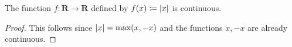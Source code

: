 \begin{proposition}\label{9.4.12}
    The function \(f : \mathbf{R} \to \mathbf{R}\) defined by \(f(x) \coloneqq \abs*{x}\) is continuous.
\end{proposition}

\begin{proof}
    This follows since \(\abs*{x} = \max(x, -x)\) and the functions \(x, -x\) are already continuous.
\end{proof}

\exercisesection

\begin{exercise}\label{ex 9.4.2}

\end{exercise}
